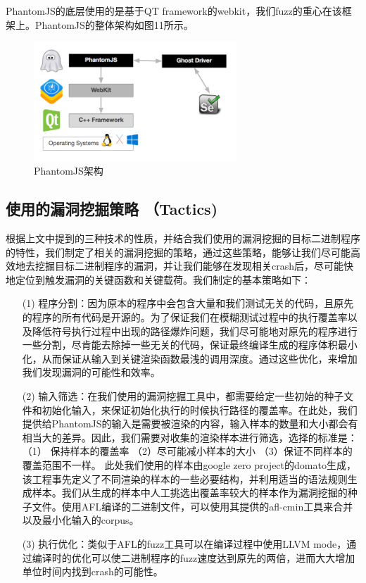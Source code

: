 \documentclass[doctor,privacy,twoside]{buaa_mac}
\begin{document}
PhantomJS的底层使用的是基于QT framework的webkit，我们fuzz的重心在该框架上。PhantomJS的整体架构如图11所示。

\centerline{}
\begin{figure}[!h]
  \centering
  \includegraphics[width=0.68\textwidth]{images/phantomjs_arch.png}
  \caption{PhantomJS架构}
  \label{fig:logo}
\end{figure}
\centerline{}


\subsection{使用的漏洞挖掘策略 （Tactics)}
根据上文中提到的三种技术的性质，并结合我们使用的漏洞挖掘的目标二进制程序的特性，我们制定了相关的漏洞挖掘的策略，通过这些策略，能够让我们尽可能高效地去挖掘目标二进制程序的漏洞，并让我们能够在发现相关crash后，尽可能快地定位到触发漏洞的关键函数和关键载荷。我们制定的基本策略如下：


\begin{itemize}
\item[(1)] 程序分割：因为原本的程序中会包含大量和我们测试无关的代码，且原先的程序的所有代码是开源的。为了保证我们在模糊测试过程中的执行覆盖率以及降低符号执行过程中出现的路径爆炸问题，我们尽可能地对原先的程序进行一些分割，尽肯能去除掉一些无关的代码，保证最终编译生成的程序体积最小化，从而保证从输入到关键渲染函数最浅的调用深度。通过这些优化，来增加我们发现漏洞的可能性和效率。

\item[(2)] 输入筛选：在我们使用的漏洞挖掘工具中，都需要给定一些初始的种子文件和初始化输入，来保证初始化执行的时候执行路径的覆盖率。在此处，我们提供给PhantomJS的输入是需要被渲染的内容，输入样本的数量和大小都会有相当大的差异。因此，我们需要对收集的渲染样本进行筛选，选择的标准是：（1） 保持样本的覆盖率 （2）尽可能减小样本的大小 （3）保证不同样本的覆盖范围不一样。 此处我们使用的样本由google zero project的domato生成，该工程事先定义了不同渲染的样本的一些必要结构，并利用适当的语法规则生成样本。我们从生成的样本中人工挑选出覆盖率较大的样本作为漏洞挖掘的种子文件。使用AFL编译的二进制文件，可以使用其提供的afl-cmin工具来合并以及最小化输入的corpus。

\item[(3)] 执行优化：类似于AFL的fuzz工具可以在编译过程中使用LLVM mode，通过编译时的优化可以使二进制程序的fuzz速度达到原先的两倍，进而大大增加单位时间内找到crash的可能性。
\end{itemize}
\end{document}
